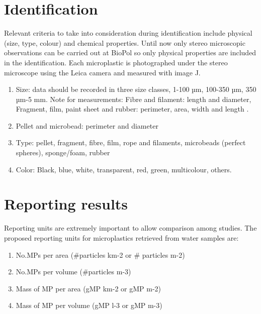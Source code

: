 \documentclass[
  icelandic,
]{book}
\providecommand{\tightlist}{%
  \setlength{\itemsep}{0pt}\setlength{\parskip}{0pt}}
\begin{document}
\hypertarget{identification}{%
\chapter{Identification}\label{identification}}

Relevant criteria to take into consideration during identification include physical (size, type, colour) and chemical properties.
Until now only stereo microscopic observations can be carried out at BioPol so only physical properties are included in the identification.
Each microplastic is photographed under the stereo microscope using the Leica camera and measured with image J.

\begin{enumerate}
\def\labelenumi{\arabic{enumi}.}
\tightlist
\item
  Size: data should be recorded in three size classes, 1-100 µm, 100-350 µm, 350 µm-5 mm. Note for measurements: Fibre and filament: length and diameter, Fragment, film, paint sheet and rubber: perimeter, area, width and length .
\item
  Pellet and microbead: perimeter and diameter
\item
  Type: pellet, fragment, fibre, film, rope and filaments, microbeads (perfect spheres), sponge/foam, rubber
\item
  Color: Black, blue, white, transparent, red, green, multicolour, others.
\end{enumerate}

\hypertarget{reporting-results}{%
\chapter{Reporting results}\label{reporting-results}}

Reporting units are extremely important to allow comparison among studies. The proposed reporting units for microplastics retrieved from water samples are:

\begin{enumerate}
\def\labelenumi{\arabic{enumi}.}
\tightlist
\item
  No.MPs per area (\#particles km-2 or \# particles m-2)
\item
  No.MPs per volume (\#particles m-3)
\item
  Mass of MP per area (gMP km-2 or gMP m-2)
\item
  Mass of MP per volume (gMP l-3 or gMP m-3)
\end{enumerate}
\end{document}
